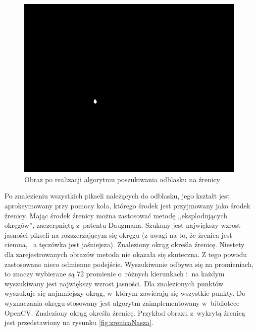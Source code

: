 \begin{figure}[h!]
\begin{center}
\includegraphics[scale=0.3]{odblask.jpg}
\caption{Obraz po realizacji algorytmu poszukiwania odblasku na źrenicy}
\label{fig:dobryOdblask}
\end{center}
\end{figure}

Po znalezieniu wszystkich pikseli należących do odblasku, jego kształt jest aproksymowany przy pomocy koła, którego środek jest przyjmowany jako środek źrenicy. Mając środek źrenicy można zastosować metodę ,,eksplodujących okręgów'', zaczerpniętą z~patentu Daugmana.  Szukany jest największy wzrost jasności pikseli na rozszerzającym się okręgu (z uwagi na to, że źrenica jest ciemna, ~a tęczówka jest jaśniejsza). Znaleziony okrąg określa źrenicę. Niestety dla zarejestrowanych obrazów metoda nie okazała się skuteczna. Z tego powodu zastosowano nieco odmienne podejście. Wyszukiwanie odbywa się na promieniach, to znaczy wybierane są 72 promienie o~różnych kierunkach i~na każdym wyszukiwany jest największy wzrost jasności. Dla znalezionych punktów wyszukuje się najmniejszy okrąg, w~którym zawierają się wszystkie punkty. Do wyznaczania okręgu stosowany jest algorytm zaimplementowany w~bibliotece OpenCV. Znaleziony okrąg określa źrenicę. Przykład obrazu z~wykrytą źrenicą jest przedstawiony na rysunku \ref{fig:zrenicaNasza}.


